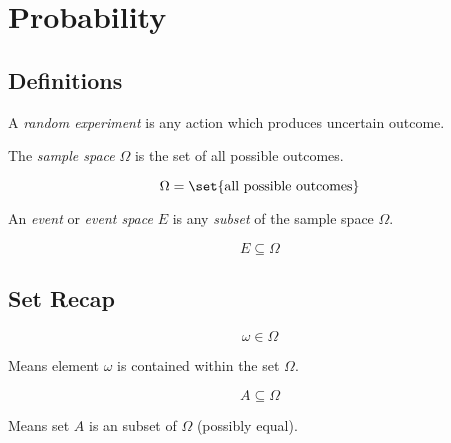 \section{Probability}

\subsection{Definitions}

\begin{definition}
    A \textit{random experiment} is any action which produces uncertain outcome.
\end{definition}

\begin{definition}
    The \textit{sample space} $\Omega$ is the set of all possible outcomes.
    
    \begin{equation}
        \Omega = \set{ \text{all possible outcomes} }
    \end{equation}
\end{definition}

\begin{definition}[Event]
    An \textit{event} or \textit{event space} $E$ is any \textit{subset} of the sample space $\Omega$.
    
    \begin{equation}
        E \subseteq \Omega
    \end{equation}
\end{definition}

\subsection{Set Recap}

\begin{definition}[Element of ($\in$)]
    \begin{equation}
        \omega \in \Omega
    \end{equation}
    
    Means element $\omega$ is contained within the set $\Omega$.
\end{definition}

\begin{definition}
    \begin{equation}
        A \subseteq \Omega
    \end{equation}
    
    Means set $A$ is an subset of $\Omega$ (possibly equal).
\end{definition}

